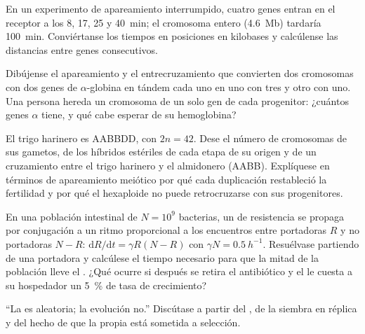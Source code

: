 \begin{exercise}[$\star\star$]\label{exo:b2:genome-diversification:8}
En un experimento de apareamiento interrumpido, cuatro genes entran en el
receptor a los 8, 17, 25 y \qty{40}{min}; el cromosoma entero
(\qty{4.6}{Mb}) tardaría \qty{100}{min}. Conviértanse los tiempos en
posiciones en kilobases y calcúlense las distancias entre genes
consecutivos.
\end{exercise}

\begin{exercise}[$\star\star$]\label{exo:b2:genome-diversification:9}
Dibújense el apareamiento y el entrecruzamiento que convierten dos
cromosomas con dos genes de $\alpha$-globina en tándem cada uno en uno con
tres y otro con uno. Una persona hereda un cromosoma de un solo gen de
cada progenitor: ¿cuántos genes $\alpha$ tiene, y qué cabe esperar de su
hemoglobina?
\end{exercise}

\begin{exercise}[$\star\star\star$]\label{exo:b2:genome-diversification:10}
El trigo harinero es AABBDD, con $2n = 42$. Dese el número de cromosomas
de sus gametos, de los híbridos estériles de cada etapa de su origen y de
un cruzamiento entre el trigo harinero y el almidonero (AABB). Explíquese
en términos de apareamiento meiótico por qué cada duplicación restableció
la fertilidad y por qué el hexaploide no puede retrocruzarse con sus
progenitores.
\end{exercise}

\begin{exercise}[$\star\star\star$]\label{exo:b2:genome-diversification:11}
En una población intestinal de $N = 10^{9}$ bacterias, un  de
resistencia se propaga por conjugación a un ritmo proporcional a los
encuentros entre portadoras $R$ y no portadoras $N - R$: $\mathrm{d}R/\mathrm{d}t =
\gamma R (N - R)$ con $\gamma N = \qty{0.5}{h^{-1}}$. Resuélvase partiendo
de una portadora y calcúlese el tiempo necesario para que la mitad de la
población lleve el . ¿Qué ocurre si después se retira el
antibiótico y el  le cuesta a su hospedador un \qty{5}{\%} de tasa
de crecimiento?
\end{exercise}

\begin{exercise}[$\star\star\star$]\label{exo:b2:genome-diversification:12}
``La  es aleatoria; la evolución no.'' Discútase a partir del
, de la siembra en réplica y del hecho de que la propia
 está sometida a selección.
\end{exercise}

